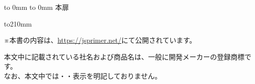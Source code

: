 \begin{comment}
%
%
\end{comment}

\thispagestyle{empty} \vbox to 0mm{\vspace*{-27.5truemm} \hbox to 0mm{
}\vss} 本扉 \pagebreak


\begin{comment}
%
%
\end{comment}

\thispagestyle{frontheadings}

\vbox to210mm{ \vfil
\vbox{
※本書の内容は、\url{https://jsprimer.net/}にて公開されています。\vspace{4mm}
}
\begin{minipage}[b]{112mm}
%
% 
\begin{spacing}{1.0}
\begin{small}
本文中に記載されている社名および商品名は、一般に開発メーカーの登録商標です。\\
なお、本文中では\texttrademark ・\textcopyright ・\textregistered 表示を明記しておりません。
\end{small}
\end{spacing}
\end{minipage}
}
